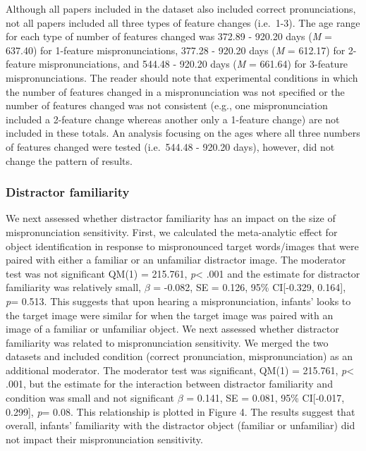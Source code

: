 \documentclass[man]{apa6}
\theoremstyle{definition}
\theoremstyle{definition}
\theoremstyle{definition}
\theoremstyle{remark}
\begin{document}
Although all papers included in the dataset also included correct
pronunciations, not all papers included all three types of feature
changes (i.e.~1-3). The age range for each type of number of features
changed was 372.89 - 920.20 days (\emph{M} = 637.40) for 1-feature
mispronunciations, 377.28 - 920.20 days (\emph{M} = 612.17) for
2-feature mispronunciations, and 544.48 - 920.20 days (\emph{M} =
661.64) for 3-feature mispronunciations. The reader should note that
experimental conditions in which the number of features changed in a
mispronunciation was not specified or the number of features changed was
not consistent (e.g., one mispronunciation included a 2-feature change
whereas another only a 1-feature change) are not included in these
totals. An analysis focusing on the ages where all three numbers of
features changed were tested (i.e.~544.48 - 920.20 days), however, did
not change the pattern of results.

\subsubsection{Distractor familiarity}\label{distractor-familiarity}

We next assessed whether distractor familiarity has an impact on the
size of mispronunciation sensitivity. First, we calculated the
meta-analytic effect for object identification in response to
mispronounced target words/images that were paired with either a
familiar or an unfamiliar distractor image. The moderator test was not
significant QM(1) = 215.761, \emph{p}\textless{} .001 and the estimate
for distractor familiarity was relatively small, \(\beta\) = -0.082, SE
= 0.126, 95\% CI{[}-0.329, 0.164{]}, \emph{p}= 0.513. This suggests that
upon hearing a mispronunciation, infants' looks to the target image were
similar for when the target image was paired with an image of a familiar
or unfamiliar object. We next assessed whether distractor familiarity
was related to mispronunciation sensitivity. We merged the two datasets
and included condition (correct pronunciation, mispronunciation) as an
additional moderator. The moderator test was significant, QM(1) =
215.761, \emph{p}\textless{} .001, but the estimate for the interaction
between distractor familiarity and condition was small and not
significant \(\beta\) = 0.141, SE = 0.081, 95\% CI{[}-0.017, 0.299{]},
\emph{p}= 0.08. This relationship is plotted in Figure 4. The results
suggest that overall, infants' familiarity with the distractor object
(familiar or unfamiliar) did not impact their mispronunciation
sensitivity.
\end{document}
